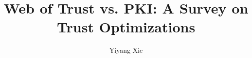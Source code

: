 \usepackage[utf8]{inputenc}
\usepackage{packages}
\usepackage{beamermods}

\author[Yiyang Xie]{Yiyang Xie}
\title[Web of Trust vs. PKI: A Survey on Trust Optimizations]{Web of Trust vs. PKI: A Survey on Trust Optimizations}



\date{}




\usepackage{pgfpages}
\usepackage{ifthen}
\newif\ifsolution%

\makeatletter
\let\@@magyar@captionfix\relax
\makeatother
